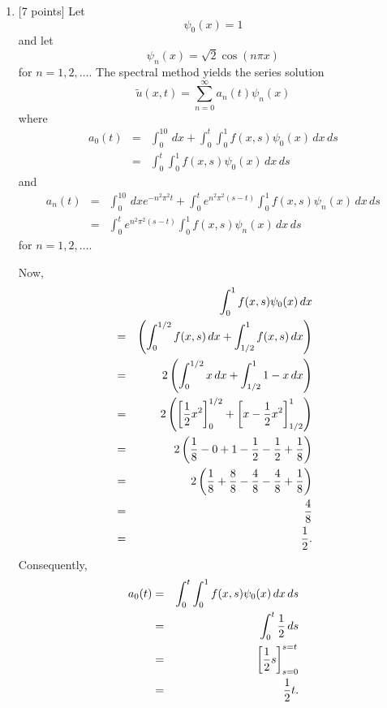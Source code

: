  \begin{solution}

\begin{enumerate}
\item {[7 points]} Let
\[
\psi_0(x)=1
\]
and let
\[
\psi_n(x) = \sqrt{2} \cos\left(n\pi x\right)
\]
for $n=1,2,\ldots$. The spectral method yields the series solution
\[
\tilde{u}(x,t)=\sum_{n=0}^\infty a_n(t)\psi_n(x)
\]
where
\begin{eqnarray*}
a_0(t)&=&\int_0^10\,dx+\int_0^t\int_0^1f(x,s)\psi_0(x)\,dx\,ds
\\
&=&\int_0^t\int_0^1f(x,s)\psi_0(x)\,dx\,ds
\end{eqnarray*}
and
\begin{eqnarray*}
a_n(t)&=&\int_0^10\,dx e^{-n^2\pi^2t}+\int_0^te^{n^2\pi^2\left(s-t\right)}\int_0^1f(x,s)\psi_n(x)\,dx\,ds
\\
&=&\int_0^te^{n^2\pi^2\left(s-t\right)}\int_0^1f(x,s)\psi_n(x)\,dx\,ds
\end{eqnarray*}
for $n=1,2,\ldots$.

Now,
\begin{eqnarray*}
&&\int_0^1f(x,s)\psi_0(x)\,dx 
\\
&=& \left(\int_0^{1/2} f(x,s)\,dx+\int_{1/2}^1 f(x,s)\,dx\right)
\\
&=& 2\left(\int_0^{1/2} x\,dx+\int_{1/2}^1 1-x\,dx\right)
\\
&=& 2\left(\left[{1 \over 2}x^2\right]_0^{1/2}+\left[x-{1 \over 2}x^2\right]_{1/2}^1\right)
\\
&=& 2\left({1 \over 8}-0+1-{1 \over 2}-{1 \over 2}+{1 \over 8}\right)
\\
&=& 2\left({1 \over 8}+{8 \over 8}-{4 \over 8}-{4 \over 8}+{1 \over 8}\right)
\\
&=& {4 \over 8}
\\
&=& {1 \over 2}.
\end{eqnarray*}
Consequently,
\begin{eqnarray*}
a_0(t)&=&\int_0^t\int_0^1f(x,s)\psi_0(x)\,dx\,ds
\\
&=&\int_0^t{1 \over 2}\,ds
\\
&=&\left[{1 \over 2}s\right]_{s=0}^{s=t}
\\
&=&{1 \over 2}t.
\end{eqnarray*}


\end{enumerate}
\end{solution}

